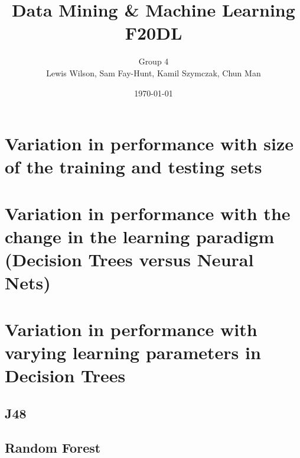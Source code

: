 \documentclass[11pt]{article}
\begin{document}
\title{\huge Data Mining \& Machine Learning F20DL} 
\author{Group 4\\Lewis Wilson, Sam Fay-Hunt, Kamil Szymczak, Chun Man }
\date{\today}
\maketitle

\newpage
\tableofcontents
\thispagestyle{empty}
\pagebreak
\setcounter{page}{1}

\newpage
\section{Variation in performance with size of the training and testing sets}

\newpage
\section{Variation in performance with the change in the learning paradigm (Decision Trees versus
Neural Nets)}

\newpage
\section{Variation in performance with varying learning parameters in Decision Trees}

\subsection{J48}



\newpage
\subsection{Random Forest}
\end{document}
